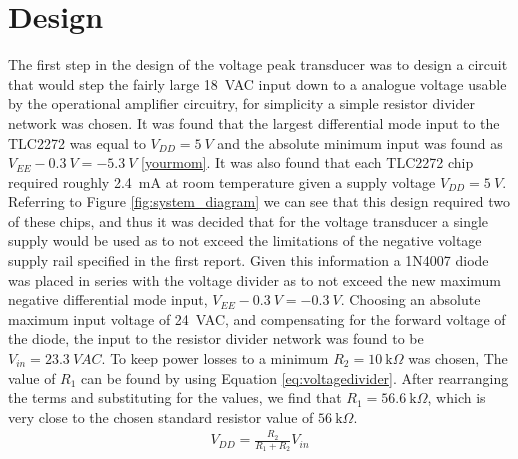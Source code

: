 \section{Design} \label{sec:design_voltage_peak_transducer}
The first step in the design of the voltage peak transducer was to design a circuit that would step the fairly large \SI{18}{VAC} input down to a analogue voltage usable by the operational amplifier circuitry, for simplicity a simple resistor divider network was chosen. It was found that the largest differential mode input to the TLC2272 was equal to $V_{DD}=\SI{5}{V}$ and the absolute minimum input was found as $V_{EE}-\SI{0.3}{V}=\SI{-5.3}{V}$ \ref{yourmom}. It was also found that each TLC2272 chip required roughly \SI{2.4}{\milli A} at room temperature given a supply voltage $V_{DD}=\SI{5}{V}$. Referring to Figure \ref{fig:system_diagram} we can see that this design required two of these chips, and thus it was decided that for the voltage transducer a single supply would be used as to not exceed the limitations of the negative voltage supply rail specified in the first report. 
Given this information a 1N4007 diode was placed in series with the voltage divider as to not exceed the new maximum negative differential mode input, $V_{EE}-\SI{0.3}{V}=\SI{-0.3}{V}$. Choosing an absolute maximum input voltage of \SI{24}{VAC}, and compensating for the forward voltage of the diode, the input to the resistor divider network was found to be $V_{in}=\SI{23.3}{VAC}$. To keep power losses to a minimum $R_{2}=\SI{10}{\kilo \Omega}$ was chosen, The value of $R_{1}$ can be found by using Equation \ref{eq:voltagedivider}. After rearranging the terms and substituting for the values, we find that $R_{1}=\SI{56.6}{\kilo \Omega}$, which is very close to the chosen standard resistor value of $\SI{56}{\kilo \Omega}$.\newline
\begin{align}
   V_{DD}=\frac{R_2}{R_1+R_2}V_{in}
   \label{eq:voltagedivider}
\end{align}

